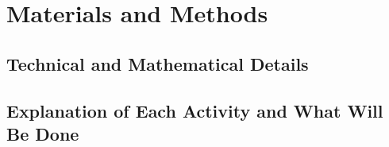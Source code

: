 \section{Materials and Methods}

\subsection{Technical and Mathematical Details}
\subsection{Explanation of Each Activity and What Will Be Done}
